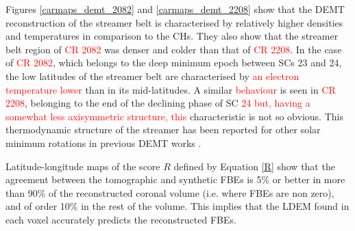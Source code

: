 \documentclass[namedreferences]{solarphysics}
\def\edit#1{\textcolor{Red}{#1}}
\begin{document}
\begin{article}
{{Figures \ref{carmaps_demt_2082} and \ref{carmaps_demt_2208} show that} the DEMT reconstruction of the streamer belt is characterised by relatively higher densities and temperatures in comparison to the CHs. They also show that the streamer belt region of \edit{CR 2082} was denser and colder than  that of \edit{CR 2208}.} In the case of \edit{CR 2082}, which belongs to the deep minimum epoch between {SCs 23 and 24}, the {low latitudes of the streamer belt are characterised by \edit{an electron temperature lower} than in its mid-latitudes.} A similar \edit{behaviour} is seen in \edit{CR 2208}, belonging to the {end of the declining} phase of SC \edit{24 but, having a somewhat less axisymmetric structure, this} characteristic is not so obvious. This thermodynamic structure of the streamer has been reported for other solar minimum rotations in previous DEMT works \citep{lloveras_2017,nuevo_2013,vasquez_2010}.

Latitude-longitude maps of the score $R$ defined by Equation \ref{R} show that {the agreement between the tomographic and synthetic FBEs is 5\% or better in more than 90\% of the reconstructed coronal volume (i.e. where FBEs are non zero), and of order 10\% in the rest of the volume. This implies that the LDEM found in each voxel accurately predicts the reconstructed FBEs.}


\end{article}
\end{document}
